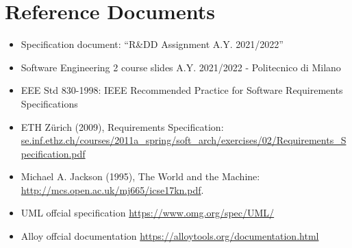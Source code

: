 \section{Reference Documents}

\begin{itemize}
    \item Specification document: “R\&DD Assignment A.Y. 2021/2022”
    \item Software Engineering 2 course slides A.Y. 2021/2022 - Politecnico di Milano
    \item EEE Std 830-1998: IEEE Recommended Practice for Software Requirements Specifications
    \item ETH Zürich (2009), Requirements Specification:\\ \url{se.inf.ethz.ch/courses/2011a_spring/soft_arch/exercises/02/Requirements_Specification.pdf} 
    \item Michael A. Jackson (1995), The World and the Machine: \url{http://mcs.open.ac.uk/mj665/icse17kn.pdf}.
    \item UML offcial specification \url{https://www.omg.org/spec/UML/}
    \item Alloy offcial documentation \url{https://alloytools.org/documentation.html}
\end{itemize}

